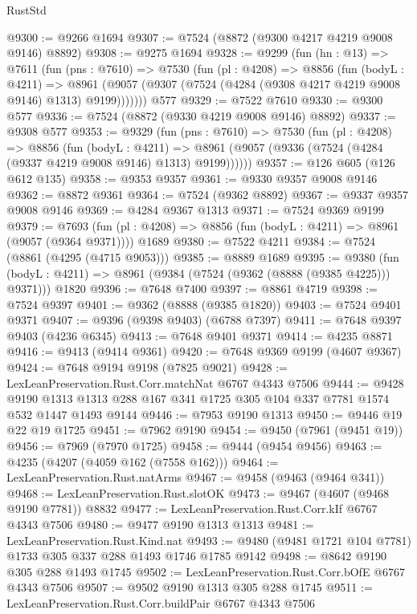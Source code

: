 \begin{lexlean}{RustStd}
\begin{coremodule}
@9300 := @9266 @1694
@9307 := @7524 (@8872 (@9300 @4217 @4219 @9008 @9146) @8892)
@9308 := @9275 @1694
@9328 := @9299
    (fun (hn : @13) =>
    @7611
      (fun (pns : @7610) =>
      @7530
        (fun (pl : @4208) =>
        @8856
          (fun (bodyL : @4211) =>
          @8961 (@9057 (@9307 (@7524 (@4284 (@9308 @4217 @4219 @9008 @9146) @1313) @9199)))))))
    @577
@9329 := @7522 @7610
@9330 := @9300 @577
@9336 := @7524 (@8872 (@9330 @4219 @9008 @9146) @8892)
@9337 := @9308 @577
@9353 := @9329
    (fun (pns : @7610) =>
    @7530
      (fun (pl : @4208) =>
      @8856
        (fun (bodyL : @4211) =>
        @8961 (@9057 (@9336 (@7524 (@4284 (@9337 @4219 @9008 @9146) @1313) @9199))))))
@9357 := @126 @605 (@126 @612 @135)
@9358 := @9353 @9357
@9361 := @9330 @9357 @9008 @9146
@9362 := @8872 @9361
@9364 := @7524 (@9362 @8892)
@9367 := @9337 @9357 @9008 @9146
@9369 := @4284 @9367 @1313
@9371 := @7524 @9369 @9199
@9379 := @7693
    (fun (pl : @4208) => @8856 (fun (bodyL : @4211) => @8961 (@9057 (@9364 @9371))))
    @1689
@9380 := @7522 @4211
@9384 := @7524 (@8861 (@4295 (@4715 @9053)))
@9385 := @8889 @1689
@9395 := @9380
    (fun (bodyL : @4211) => @8961 (@9384 (@7524 (@9362 (@8888 (@9385 @4225))) @9371)))
    @1820
@9396 := @7648 @7400
@9397 := @8861 @4719
@9398 := @7524 @9397
@9401 := @9362 (@8888 (@9385 @1820))
@9403 := @7524 @9401 @9371
@9407 := @9396 (@9398 @9403) (@6788 @7397)
@9411 := @7648 @9397 @9403 (@4236 @6345)
@9413 := @7648 @9401 @9371
@9414 := @4235 @8871
@9416 := @9413 (@9414 @9361)
@9420 := @7648 @9369 @9199 (@4607 @9367)
@9424 := @7648 @9194 @9198 (@7825 @9021)
@9428 := LexLeanPreservation.Rust.Corr.matchNat @6767 @4343 @7506
@9444 := @9428
    @9190
    @1313
    @1313
    @288
    @167
    @341
    @1725
    @305
    @104
    @337
    @7781
    @1574
    @532
    @1447
    @1493
    @9144
@9446 := @7953 @9190 @1313
@9450 := @9446 @19 @22 @19 @1725
@9451 := @7962 @9190
@9454 := @9450 (@7961 (@9451 @19))
@9456 := @7969 (@7970 @1725)
@9458 := @9444 (@9454 @9456)
@9463 := @4235 (@4207 (@4059 @162 (@7558 @162)))
@9464 := LexLeanPreservation.Rust.natArms
@9467 := @9458 (@9463 (@9464 @341))
@9468 := LexLeanPreservation.Rust.slotOK
@9473 := @9467 (@4607 (@9468 @9190 @7781)) @8832
@9477 := LexLeanPreservation.Rust.Corr.kIf @6767 @4343 @7506
@9480 := @9477 @9190 @1313 @1313
@9481 := LexLeanPreservation.Rust.Kind.nat
@9493 := @9480 (@9481 @1721 @104 @7781) @1733 @305 @337 @288 @1493 @1746 @1785 @9142
@9498 := @8642 @9190 @305 @288 @1493 @1745
@9502 := LexLeanPreservation.Rust.Corr.bOfE @6767 @4343 @7506
@9507 := @9502 @9190 @1313 @305 @288 @1745
@9511 := LexLeanPreservation.Rust.Corr.buildPair @6767 @4343 @7506

\end{coremodule}
\end{lexlean}
